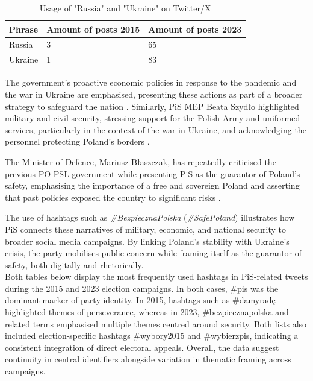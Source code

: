 \begin{table}[H]
    \centering
    \begin{tabular}{p{4cm}p{4cm}p{4cm}}
        \toprule
        \textbf{Phrase} & \textbf{Amount of posts 2015}  & \textbf{Amount of posts 2023} \\ \midrule
        Russia & 3 & 65  \\
        Ukraine & 1 & 83  \\ \bottomrule
    \end{tabular}
    \caption{Usage of "Russia" and "Ukraine" on Twitter/X \citep{rybicki_2025_16933320}}
    \label{tab:phrases-comp-2-2015-2023}
\end{table}

The government's proactive economic policies in response to the pandemic and the war in Ukraine are emphasised, presenting these actions as part of a broader strategy to safeguard the nation \citep{pisorgpl2023g}. Similarly, PiS MEP Beata Szydło highlighted military and civil security, stressing support for the Polish Army and uniformed services, particularly in the context of the war in Ukraine, and acknowledging the personnel protecting Poland's borders \citep{pisorgpl2023h}.

The Minister of Defence, Mariusz Błaszczak, has repeatedly criticised the previous PO-PSL government while presenting PiS as the guarantor of Poland's safety, emphasising the importance of a free and sovereign Poland and asserting that past policies exposed the country to significant risks \citep{pisorgpl2023i}.

The use of hashtags such as \textit{\#BezpiecznaPolska} (\textit{\#SafePoland}) illustrates how PiS connects these narratives of military, economic, and national security to broader social media campaigns. By linking Poland's stability with Ukraine's crisis, the party mobilises public concern while framing itself as the guarantor of safety, both digitally and rhetorically. \\

Both tables below display the most frequently used hashtags in PiS-related tweets during the 2015 and 2023 election campaigns. In both cases, \#pis was the dominant marker of party identity. In 2015, hashtags such as \#damyradę highlighted themes of perseverance, whereas in 2023, \#bezpiecznapolska and related terms emphasised multiple themes centred around security. Both lists also included election-specific hashtags \#wybory2015 and \#wybierzpis, indicating a consistent integration of direct electoral appeals. Overall, the data suggest continuity in central identifiers alongside variation in thematic framing across campaigns.

